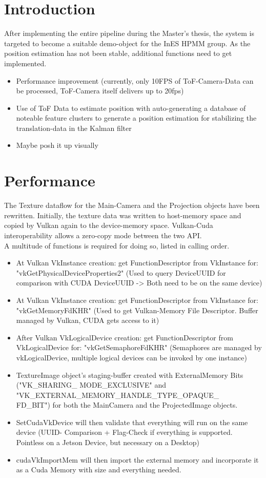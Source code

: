 \chapter{Introduction}
\label{sec:Introduction}
After implementing the entire pipeline during the Master's thesis, the system is targeted to become a suitable demo-object for the InES HPMM group. As the position estimation has not been stable, additional functions need to get implemented.
\begin{itemize} %
	\item Performance improvement (currently, only 10FPS of ToF-Camera-Data can be processed, ToF-Camera itself delivers up to 20fps)
	\item Use of ToF Data to estimate position with auto-generating a database of noteable feature clusters to generate a position estimation for stabilizing the translation-data in the Kalman filter
	\item Maybe posh it up visually
\end{itemize}

\chapter{Performance}
\label{sec:Terminology}
The Texture dataflow for the Main-Camera and the Projection objects have been rewritten. Initially, the texture data was written to host-memory space and copied by Vulkan again to the device-memory space. Vulkan-Cuda interoperability allows a zero-copy mode between the two API.\\
A multitude of functions is required for doing so, listed in calling order. 

\begin{itemize} %
	\item At Vulkan VkInstance creation: get FunctionDescriptor from VkInstance for: "vkGetPhysicalDeviceProperties2" (Used to query DeviceUUID for comparison with CUDA DeviceUUID -> Both need to be on the same device)
	\item At Vulkan VkInstance creation: get FunctionDescriptor from VkInstance for: "vkGetMemoryFdKHR" (Used to get Vulkan-Memory File Descriptor. Buffer managed by Vulkan, CUDA gets access to it)
	\item After Vulkan VkLogicalDevice creation: get FunctionDescriptor from VkLogicalDevice for: "vkGetSemaphoreFdKHR" (Semaphores are managed by vkLogicalDevice, multiple logical devices can be invoked by one instance)
    \item TextureImage object's staging-buffer created with ExternalMemory Bits ("VK\_SHARING\_ MODE\_EXCLUSIVE" and "VK\_EXTERNAL\_MEMORY\_HANDLE\_TYPE\_OPAQUE\_\\FD\_BIT") for both the MainCamera and the ProjectedImage objects.
    \item SetCudaVkDevice will then validate that everything will run on the same device (UUID- Comparison + Flag-Check if everything is supported. Pointless on a Jetson Device, but necessary on a Desktop)
    \item cudaVkImportMem will then import the external memory and incorporate it as a Cuda Memory with size and everything needed.
\end{itemize}

